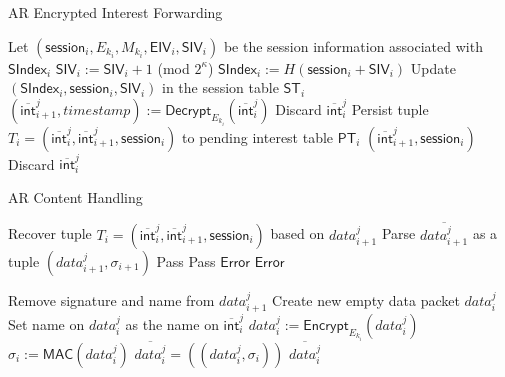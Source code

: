 \begin{algorithm}[ht!]
  \caption{AR Encrypted Interest Forwarding}
  \begin{algorithmic}[1]
  \State Let $(\mathsf{session}_i, E_{k_i}, M_{k_i}, \mathsf{EIV}_i, \mathsf{SIV}_i)$ be the session information associated with $\mathsf{SIndex}_i$
  \State $\mathsf{SIV}_i := \mathsf{SIV}_i + 1$ (mod $2^{\kappa}$)
  \State $\mathsf{SIndex}_i := H(\mathsf{session}_i + \mathsf{SIV}_i)$
  \State Update $(\mathsf{SIndex}_i, \mathsf{session}_i, \mathsf{SIV}_i)$ in the session table $\mathsf{ST}_i$
  \State $(\overline{\mathsf{int}}_{i+1}^{j}, timestamp) := \mathsf{Decrypt}_{E_{k_i}}(\overline{\mathsf{int}}_{i}^{j})$
    \State Discard $\overline{\mathsf{int}}_{i}^{j}$
  \Else
    \State Persist tuple $T_i = (\overline{\mathsf{int}}_{i}^{j}, \overline{\mathsf{int}}_{i+1}^{j}, \mathsf{session}_i)$ to pending interest table $\mathsf{PT}_i$
    \State \Return $(\overline{\mathsf{int}}_{i+1}^{j}, \mathsf{session}_i)$
  \EndIf
\Else
  \State Discard $\overline{\mathsf{int}}_{i}^{j}$ 
\EndIf
\end{algorithmic}
\label{alg:enc_int_forward}
\end{algorithm}

\begin{algorithm}[ht!]
  \caption{AR Content Handling}
  \begin{algorithmic}[1]
\State Recover tuple $T_i = (\overline{\mathsf{int}}_{i}^{j}, \overline{\mathsf{int}}_{i+1}^{j}, \mathsf{session}_i)$ based on $data_{i+1}^j$
\State Parse $\overline{data_{i+1}^j}$ as a tuple $(data_{i+1}^j, \sigma_{i+1})$
 
  \State Pass
    \State Pass
  \Else
    \State \Return $\mathsf{Error}$ 
  \EndIf
\Else {}
  \State \Return $\mathsf{Error}$
\EndIf

\State Remove signature and name from $data_{i+1}^j$    
\State Create new empty data packet $data_i^j$
\State Set name on $data_i^j$ as the name on $\overline{\mathsf{int}}_{i}^{j}$
\State $data_i^j := \mathsf{Encrypt}_{E_{k_i}}(data_i^j)$
\State $\sigma_i := \mathsf{MAC}(data_i^j)$
\State $\overline{data_{i}^j} = ((data_i^j, \sigma_i))$
\State \Return $\overline{data_{i}^j}$

\end{algorithmic}
\label{alg:ar_content_handler}
\end{algorithm}

